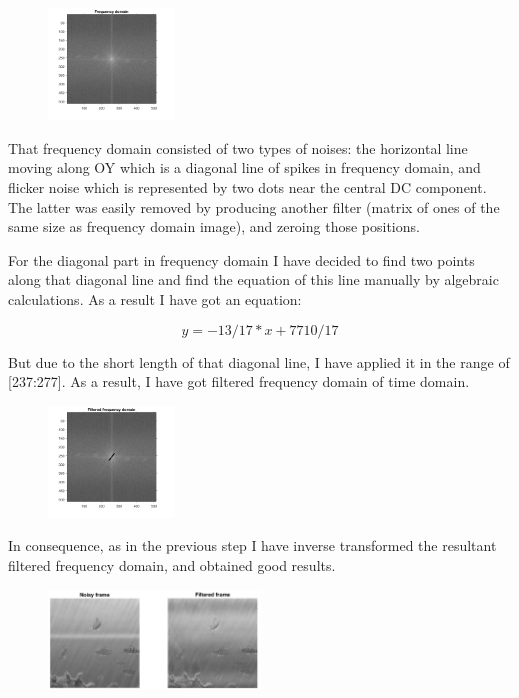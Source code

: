 \documentclass{IEEEtran}
\begin{document}
\begin{figure}[h]
	\centering
	\includegraphics[width=0.3\textwidth]{time_domain.png}
\end{figure}

That frequency domain consisted of two types of noises: the horizontal line moving along OY which is a diagonal line of spikes in frequency domain, and flicker noise which is represented by two dots near the central DC component. The latter was easily removed by producing another filter (matrix of ones of the same size as frequency domain image), and zeroing those positions.

For the diagonal part in frequency domain I have decided to find two points along that diagonal line and find the equation of this line manually by algebraic calculations. As a result I have got an equation:

\begin{equation}
	y = -13/17*x + 7710/17
\end{equation}

But due to the short length of that diagonal line, I have applied it in the range of [237:277]. As a result, I have got filtered frequency domain of time domain.

\begin{figure}[h]
	\centering
	\includegraphics[width=0.3\textwidth]{filtered_time.png}
\end{figure}

In consequence, as in the previous step I have inverse transformed the resultant filtered frequency domain, and obtained good results.

\begin{figure}[h]
	\centering
	\includegraphics[width=0.5\textwidth]{3.png}
\end{figure}
\end{document}
